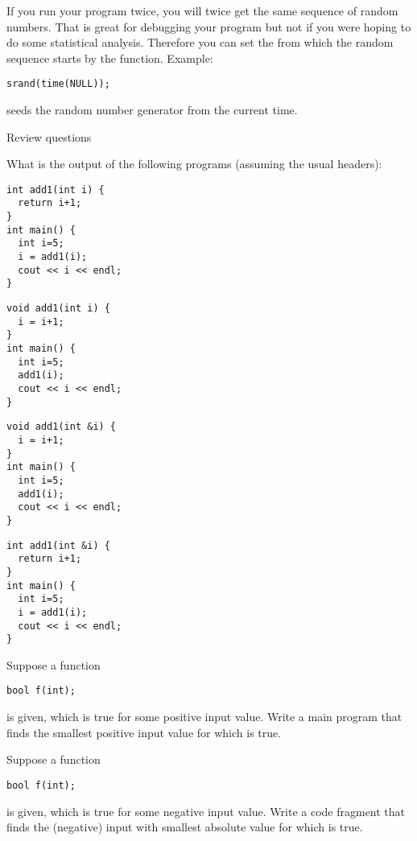 If you run your program twice, you will twice get the same sequence of
random numbers. That is great for debugging your program but not if
you were hoping to do some statistical analysis. Therefore you can set
the  from which the random sequence
starts by the  function. Example:
\begin{verbatim}
srand(time(NULL));
\end{verbatim}
seeds the random number generator from the current time.

 {Review questions}

\begin{exercise}
  What is the output of the following programs (assuming the usual headers):

  \begin{multicols}{2}
\begin{verbatim}
int add1(int i) {
  return i+1;
}
int main() {
  int i=5;
  i = add1(i);
  cout << i << endl;
}
\end{verbatim}
\columnbreak
\begin{verbatim}
void add1(int i) {
  i = i+1;
}
int main() {
  int i=5;
  add1(i);
  cout << i << endl;
}
\end{verbatim}
  \end{multicols}

  \begin{multicols}{2}
\begin{verbatim}
void add1(int &i) {
  i = i+1;
}
int main() {
  int i=5;
  add1(i);
  cout << i << endl;
}
\end{verbatim}
\columnbreak
\begin{verbatim}
int add1(int &i) {
  return i+1;
}
int main() {
  int i=5;
  i = add1(i);
  cout << i << endl;
}
\end{verbatim}
  \end{multicols}
\end{exercise}

\begin{exercise}
  \label{ex:cpp-funcloop1}
  Suppose a function
\begin{verbatim}
bool f(int);
\end{verbatim}
is given, which is true for some positive input value. Write a main program that
finds the smallest positive input value for which  is true.
\end{exercise}

\begin{exercise}
  \label{ex:cpp-funcloop2}
  Suppose a function
\begin{verbatim}
bool f(int);
\end{verbatim}
is given, which is true for some negative input value. Write a code fragment that
finds the (negative) input with smallest absolute value for which  is true.
\end{exercise}

